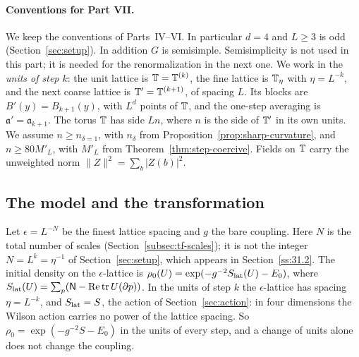\paragraph{Conventions for Part VII.} We keep the conventions of Parts~IV--VI. In particular $d=4$ and $L\ge3$ is odd (Section~\ref{sec:setup}). In addition $G$ is semisimple. Semisimplicity is not used in this part; it is needed for the renormalization in the next one. We work in the \emph{units of step $k$}: the unit lattice is $\mathbb T=\mathbb T^{(k)}$, the fine lattice is $\mathbb T_\eta$ with $\eta=L^{-k}$, and the next coarse lattice is $\mathbb T'=\mathbb T^{(k+1)}$, of spacing $L$. Its blocks are $B'(y)=B_{k+1}(y)$, with $L^d$ points of $\mathbb T$, and the one-step averaging is $\mathfrak a'=\mathfrak a_{k+1}$. The torus $\mathbb T$ has side $Ln$, where $n$ is the side of $\mathbb T'$ in its own units. We assume $n\ge n_{\delta=1}$, with $n_\delta$ from Proposition~\ref{prop:sharp-curvature}, and $n\ge80M'_L$, with $M'_L$ from Theorem~\ref{thm:step-coercive}. Fields on $\mathbb T$ carry the unweighted norm $\|Z\|^2=\sum_b|Z(b)|^2$.

\subsection{The model and the transformation}\label{ss:31.1}

Let $\epsilon=L^{-N}$ be the finest lattice spacing and $g$ the bare coupling. Here $N$ is the total number of scales (Section~\ref{subsec:tf-scales}); it is not the integer $N=L^k=\eta^{-1}$ of Section~\ref{sec:setup}, which appears in Section~\ref{ss:31.2}. The initial density on the $\epsilon$-lattice is $\rho_0(U)=\exp(-g^{-2}S_{\rm lat}(U)-E_0)$, where $S_{\rm lat}(U)=\sum_p(\mathsf N-\operatorname{Re}\operatorname{tr}U(\partial p))$. In the units of step $k$ the $\epsilon$-lattice has spacing $\eta=L^{-k}$, and $S_{\rm lat}=S$, the action of Section~\ref{sec:action}: in four dimensions the Wilson action carries no power of the lattice spacing. So $\rho_0=\exp(-g^{-2}S-E_0)$ in the units of every step, and a change of units alone does not change the coupling.

